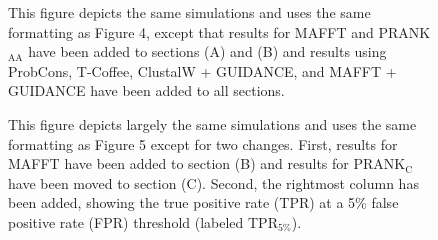 \documentclass{article}
\begin{document}
\renewcommand\refname{Literature Cited}

\newcommand{\mtwo}{PAML M2a\xspace}
\newcommand{\meight}{PAML M8\xspace}
\newcommand{\pranka}{PRANK$_{\textrm{AA}}$\xspace}
\newcommand{\prankc}{PRANK$_{\textrm{C}}$\xspace}
\newcommand{\omg}{\bm{\omega}\xspace}
\newcommand{\tpr}{TPR$_{1\%}$\xspace}
\newcommand{\tprf}{TPR$_{5\%}$\xspace}
\newcommand{\sw}{sitewise\xspace}
\newcommand{\Sw}{Sitewise\xspace}
\newcommand{\Dr}{{\emph{Drosophila}}\xspace}
\newcommand{\tcr}[1]{#1}
\newcommand{\tcrr}[1]{\textcolor{red}{#1}}
\newcommand{\nsyn}{nonsynonymous\xspace}
\newcommand{\syn}{synonymous\xspace}
\newcommand{\nh}{non-homologous\xspace}
\newcommand{\hidegraphics}[2]{}

\makeatletter 
\renewcommand{\figurename}{Supplementary Figure}
\renewcommand{\thefigure}{S\@arabic\c@figure} 

\begin{figure}[t]
\begin{center}
\hidegraphics{scale=0.65}{supp_fig1.pdf}
\end{center}
\caption{This figure depicts the same simulations and uses the same
  formatting as Figure 4, except that results for MAFFT and \pranka
  have been added to sections (A) and (B) and results using ProbCons,
  T-Coffee, ClustalW + GUIDANCE, and MAFFT + GUIDANCE have been added
  to all sections.}
\label{supp_fig1}
\end{figure}

\begin{figure}[t]
\begin{center}

\hidegraphics{scale=0.55}{supp_fig2.pdf}
\end{center}
\caption{This figure depicts largely the same simulations and uses the
  same formatting as Figure 5 except for two changes. First,
  results for MAFFT have been added to section (B) and results for
  \prankc have been moved to section (C). Second, the rightmost column
  has been added, showing the true positive rate (TPR) at a 5\% false
  positive rate (FPR) threshold (labeled \tprf).}
\label{supp_fig2}
\end{figure}
\end{document}
